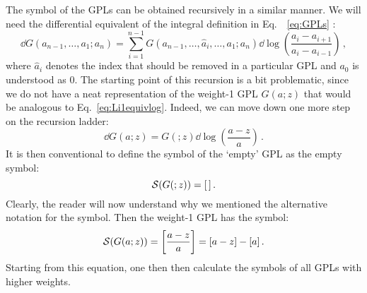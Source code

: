 \documentclass[main.tex]{subfiles}
\begin{document}
The symbol of the GPLs can be obtained recursively in a similar manner. We will need the differential equivalent of the integral definition in Eq.~\
\ref{eq:GPLs} \cite{2001math......3059G}:
\begin{equation} \label{eq:GPLdifferential}
    \dd G(a_{n-1}, \ldots, a_1; a_n) = \sum_{i=1}^{n-1} G(a_{n-1}, \ldots, \hat{a}_i, \ldots, a_1; a_n) \dd \log\left( \frac{a_i - a_{i+1}}{a_i - a_{i-1}} \right)\,,
\end{equation}
where $\hat{a}_i$ denotes the index that should be removed in a particular GPL and $a_0$ is understood as 0. The starting point of this recursion is a bit problematic, since we do not have a neat representation of the weight-1 GPL $G(a; z)$ that would be analogous to Eq.~\ref{eq:Li1equivlog}.  Indeed, we can move down one more step on the recursion ladder:
\begin{equation}
    \dd G(a; z) = G(;z) \dd \log \left(\frac{a-z}{a} \right)\,.
\end{equation}
It is then conventional to define the symbol of the `empty' GPL as the empty symbol:
\begin{equation}
    \mathcal{S} (G(;z)) = [\,]\,.
\end{equation}
Clearly, the reader will now understand why we mentioned the alternative notation for the symbol. Then the weight-1 GPL has the symbol:
\begin{equation} \label{eq:G1symbol}
    \mathcal{S}(G(a; z)) = \left[\frac{a-z}{a} \right] = [a-z] - [a]\,.
\end{equation}
Starting from this equation, one then then calculate the symbols of all GPLs with higher weights.
\end{document}
